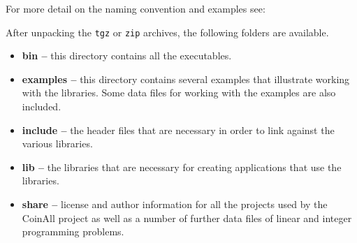 For more detail on the naming convention and examples see:

\medskip
\noindent{\tt\UrlCoinNames}
\medskip

After unpacking the {\tt tgz} or {\tt zip} archives, the following folders are available.
\begin{itemize}

\item[] {\bf bin --} this directory contains all the executables.

\item[] {\bf examples --} this directory contains several examples that illustrate working with 
the libraries. Some data files for working with the examples are also included.

\item[]  {\bf include --} the header files that are necessary in order to link against the various libraries.

\item[] {\bf lib --} the libraries that are necessary for creating applications that use the  libraries.

\item[] {\bf  share --} license and author information for all the projects used by the CoinAll project as well as a number of further data files of linear and integer programming problems.
\end{itemize}




